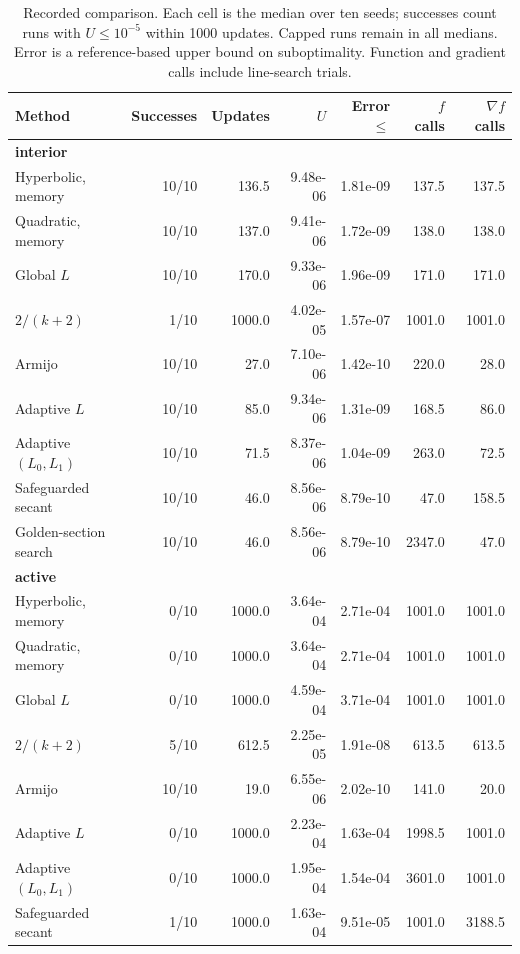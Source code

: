 \begin{table}[p]
\centering\small
\caption{Recorded comparison. Each cell is the median over ten seeds; successes count runs with $U\le10^{-5}$ within 1000 updates. Capped runs remain in all medians. Error is a reference-based upper bound on suboptimality. Function and gradient calls include line-search trials.}
\label{tab:results}
\begin{tabular}{lrrrrrr}
\hline
Method & Successes & Updates & $U$ & Error $\le$ & $f$ calls & $\nabla f$ calls \\
\hline
\multicolumn{7}{l}{\textbf{interior}} \\
Hyperbolic, memory & 10/10 & 136.5 & 9.48e-06 & 1.81e-09 & 137.5 & 137.5 \\
Quadratic, memory & 10/10 & 137.0 & 9.41e-06 & 1.72e-09 & 138.0 & 138.0 \\
Global $L$ & 10/10 & 170.0 & 9.33e-06 & 1.96e-09 & 171.0 & 171.0 \\
$2/(k+2)$ & 1/10 & 1000.0 & 4.02e-05 & 1.57e-07 & 1001.0 & 1001.0 \\
Armijo & 10/10 & 27.0 & 7.10e-06 & 1.42e-10 & 220.0 & 28.0 \\
Adaptive $L$ & 10/10 & 85.0 & 9.34e-06 & 1.31e-09 & 168.5 & 86.0 \\
Adaptive $(L_0,L_1)$ & 10/10 & 71.5 & 8.37e-06 & 1.04e-09 & 263.0 & 72.5 \\
Safeguarded secant & 10/10 & 46.0 & 8.56e-06 & 8.79e-10 & 47.0 & 158.5 \\
Golden-section search & 10/10 & 46.0 & 8.56e-06 & 8.79e-10 & 2347.0 & 47.0 \\
\hline
\multicolumn{7}{l}{\textbf{active}} \\
Hyperbolic, memory & 0/10 & 1000.0 & 3.64e-04 & 2.71e-04 & 1001.0 & 1001.0 \\
Quadratic, memory & 0/10 & 1000.0 & 3.64e-04 & 2.71e-04 & 1001.0 & 1001.0 \\
Global $L$ & 0/10 & 1000.0 & 4.59e-04 & 3.71e-04 & 1001.0 & 1001.0 \\
$2/(k+2)$ & 5/10 & 612.5 & 2.25e-05 & 1.91e-08 & 613.5 & 613.5 \\
Armijo & 10/10 & 19.0 & 6.55e-06 & 2.02e-10 & 141.0 & 20.0 \\
Adaptive $L$ & 0/10 & 1000.0 & 2.23e-04 & 1.63e-04 & 1998.5 & 1001.0 \\
Adaptive $(L_0,L_1)$ & 0/10 & 1000.0 & 1.95e-04 & 1.54e-04 & 3601.0 & 1001.0 \\
Safeguarded secant & 1/10 & 1000.0 & 1.63e-04 & 9.51e-05 & 1001.0 & 3188.5 \\

\end{tabular}
\end{table}
